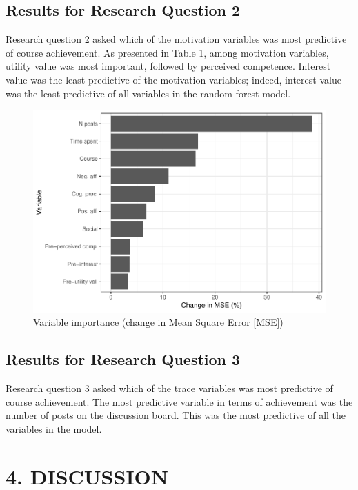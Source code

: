 \documentclass[acmart]{apa6}
\theoremstyle{definition}
\theoremstyle{definition}
\theoremstyle{definition}
\theoremstyle{remark}
\begin{document}
\subsection{Results for Research Question
2}\label{results-for-research-question-2}

Research question 2 asked which of the motivation variables was most
predictive of course achievement. As presented in Table 1, among
motivation variables, utility value was most important, followed by
perceived competence. Interest value was the least predictive of the
motivation variables; indeed, interest value was the least predictive of
all variables in the random forest model.

\begin{figure}
\centering
\includegraphics{LAK_Manuscript_files/figure-latex/unnamed-chunk-4-1.pdf}
\caption{\label{fig:unnamed-chunk-4}Variable importance (change in Mean
Square Error {[}MSE{]})}
\end{figure}

\subsection{Results for Research Question
3}\label{results-for-research-question-3}

Research question 3 asked which of the trace variables was most
predictive of course achievement. The most predictive variable in terms
of achievement was the number of posts on the discussion board. This was
the most predictive of all the variables in the model.

\section{4. DISCUSSION}\label{discussion}
\end{document}
